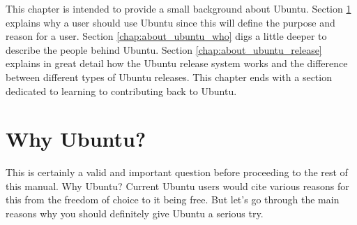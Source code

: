 This chapter is intended to provide a small background about Ubuntu. Section \ref{chap:about_ubuntu_why} explains why a user should use Ubuntu since this will define the purpose and reason for a user. Section \ref{chap:about_ubuntu_who} digs a little deeper to describe the people behind Ubuntu. Section \ref{chap:about_ubuntu_release} explains in great detail how the Ubuntu release system works and the difference between different types of Ubuntu releases. This chapter ends with a section dedicated to learning to contributing back to Ubuntu.

\section{Why Ubuntu?} \label{chap:about_ubuntu_why}
This is certainly a valid and important question before proceeding to the rest of this manual. Why Ubuntu? Current Ubuntu users would cite various reasons for this from the freedom of choice to it being free. But let's go through the main reasons why you should definitely give Ubuntu a serious try.

